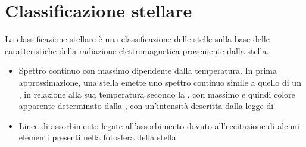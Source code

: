 \documentclass[letterpaper,10pt,italian]{jupyterBook}
\begin{document}
\sphinxstepscope


\section{Classificazione stellare}
\label{\detokenize{ch/modern/astronomy-star-classification:classificazione-stellare}}\label{\detokenize{ch/modern/astronomy-star-classification:physics-hs-modern-star-classification}}\label{\detokenize{ch/modern/astronomy-star-classification::doc}}
\sphinxAtStartPar
La classificazione stellare è una classificazione delle stelle sulla base delle caratteristiche della radiazione elettromagnetica proveniente dalla stella.
\begin{itemize}
\item {} 
\sphinxAtStartPar
Spettro continuo con massimo dipendente dalla temperatura. In prima approssimazione, una stella emette uno spettro continuo simile a quello di un {\hyperref[\detokenize{ch/modern/quantum:physics-hs-modern-quantum-experience-black-body}]{}}, in relazione alla sua temperatura secondo la {\hyperref[\detokenize{ch/modern/quantum:physics-hs-modern-quantum-experience-black-body-planck}]{}}, con massimo e quindi colore apparente determinato dalla {\hyperref[\detokenize{ch/modern/quantum:physics-hs-modern-quantum-experience-black-body-wien}]{}}, con un’intensità descritta dalla legge di {\hyperref[\detokenize{ch/modern/quantum:physics-hs-modern-quantum-experience-black-body-stefan-boltzmann}]{}}

\item {} 
\sphinxAtStartPar
Linee di assorbimento legate all’assorbimento dovuto all’eccitazione di alcuni elementi presenti nella fotosfera della stella

\end{itemize}
\end{document}
